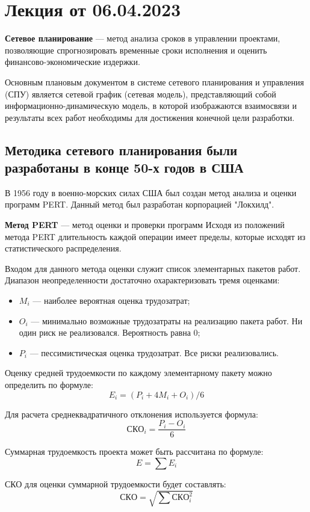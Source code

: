 
\section{Лекция от 06.04.2023}
\textbf{Сетевое планирование} --- метод анализа сроков в управлении проектами,
позволяющие спрогнозировать временные сроки исполнения и оценить
финансово-экономические издержки.

Основным плановым документом в системе сетевого планирования и управления (СПУ)
является сетевой график (сетевая модель), представляющий собой
информационно-динамическую модель, в которой изображаются взаимосвязи и
результаты всех работ необходимы для достижения конечной цели разработки.

\subsection{Методика сетевого планирования были разработаны в конце 50-х годов в
  США}
В 1956 году в военно-морских силах США был создан метод анализа и оценки
программ PERT. Данный метод был разработан корпорацией "Локхилд".\par
\textbf{Метод PERT} --- метод оценки и проверки программ Исходя из положений
метода PERT длительность каждой операции имеет пределы, которые исходят из
статистического распределения.

Входом для данного метода оценки служит список элементарных пакетов работ.
Диапазон неопределенности достаточно охарактеризовать тремя оценками:
\begin{itemize}
  \item $M_i$  --- наиболее вероятная оценка трудозатрат;
  \item $O_i$  --- минимально возможные трудозатраты на реализацию пакета работ.
    Ни один риск не реализовался. Вероятность равна 0;
  \item $P_i$  --- пессимистическая оценка трудозатрат. Все риски реализовались.
\end{itemize}
Оценку средней трудоемкости по каждому элементарному пакету можно определить по
формуле:
\[
  E_i = (P_i + 4M_i + O_i) / 6
\] 

Для расчета среднеквадратичного отклонения используется формула:
\[
  СКО_i = \frac{P_i - O_i}{6}
\] 

Суммарная трудоемкость проекта может быть рассчитана по формуле:
\[
  E = \sum E_i
\] 

СКО для оценки суммарной трудоемкости будет составлять:
\[
  СКО = \sqrt{\sum СКО_i^2} 
\] 

